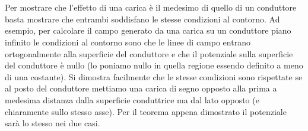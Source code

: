 \documentclass[
10pt, %
a4paper, %
oneside, %
headinclude,footinclude, %
BCOR5mm, %
]{scrartcl}
\begin{document}
\\\\
Per mostrare che l'effetto di una carica è il medesimo di quello di un conduttore basta mostrare che entrambi soddisfano le stesse condizioni al contorno. Ad esempio, per calcolare il campo generato da una carica su un conduttore piano infinito le condizioni al contorno sono che le linee di campo entrano ortogonalmente alla superficie del conduttore e che il potenziale sulla superficie del conduttore è nullo (lo poniamo nullo in quella regione essendo definito a meno di una costante). Si dimostra facilmente che le stesse condizioni sono rispettate se al posto del conduttore mettiamo una carica di segno opposto alla prima a medesima distanza dalla superficie conduttrice ma dal lato opposto (e chiaramente sullo stesso asse). Per il teorema appena dimostrato il potenziale sarà lo stesso nei due casi. 
\newpage
\end{document}
